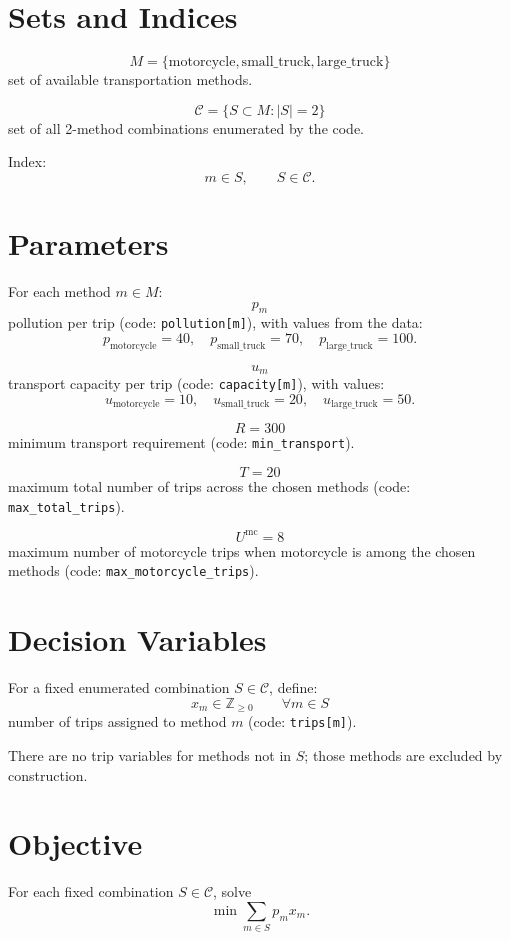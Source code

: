 \section*{Sets and Indices}

\[
M=\{\text{motorcycle},\text{small\_truck},\text{large\_truck}\}
\]
set of available transportation methods.

\[
\mathcal{C}=\{S \subset M : |S|=2\}
\]
set of all 2-method combinations enumerated by the code.

Index:
\[
m \in S,\qquad S \in \mathcal{C}.
\]

\section*{Parameters}

For each method \(m \in M\):
\[
p_m
\]
pollution per trip (code: \texttt{pollution[m]}), with values from the data:
\[
p_{\text{motorcycle}}=40,\quad
p_{\text{small\_truck}}=70,\quad
p_{\text{large\_truck}}=100.
\]

\[
u_m
\]
transport capacity per trip (code: \texttt{capacity[m]}), with values:
\[
u_{\text{motorcycle}}=10,\quad
u_{\text{small\_truck}}=20,\quad
u_{\text{large\_truck}}=50.
\]

\[
R = 300
\]
minimum transport requirement (code: \texttt{min\_transport}).

\[
T = 20
\]
maximum total number of trips across the chosen methods (code: \texttt{max\_total\_trips}).

\[
U^{\text{mc}} = 8
\]
maximum number of motorcycle trips when motorcycle is among the chosen methods (code: \texttt{max\_motorcycle\_trips}).

\section*{Decision Variables}

For a fixed enumerated combination \(S \in \mathcal{C}\), define:
\[
x_m \in \mathbb{Z}_{\ge 0} \qquad \forall m \in S
\]
number of trips assigned to method \(m\) (code: \texttt{trips[m]}).

There are no trip variables for methods not in \(S\); those methods are excluded by construction.

\section*{Objective}

For each fixed combination \(S \in \mathcal{C}\), solve
\[
\min \sum_{m \in S} p_m x_m .
\]

